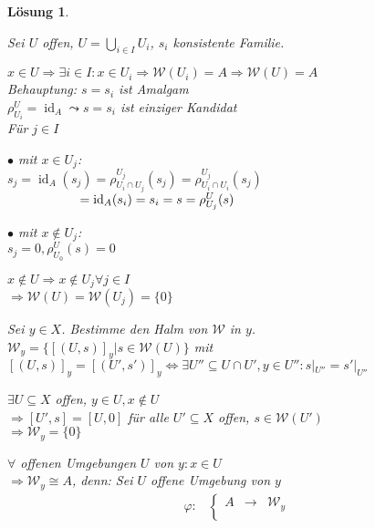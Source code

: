 \documentclass[a4paper, 12pt, numbers=noendperiod, chapterprefix=true]{scrbook}
\theoremstyle{break}
\newtheorem{Loes}{L\"osung}
\theoremstyle{nonumberbreak}
\theoremstyle{nonumberplain}
\DeclareMathOperator{\id}{id}
\newcommand{\calW}{\mathcal{W}}
\begin{document}
\begin{Loes}\begin{enumerate}[a)]
\item
  Sei $U$ offen, $U = \bigcup\limits_{i\in I} U_i$, $s_i$ konsistente Familie.
  \begin{description}[\setlabelstyle{\itshape}]
  \item[Fall 1:]
    $x \in U \Rightarrow \exists i \in I: x\in U_i \Rightarrow \calW(U_i) = A \Rightarrow  \calW(U) = A$\\
    \emph{Behauptung:} $s=s_i$ ist Amalgam\\
    $\rho_{U_i}^U= \id_A \leadsto s = s_i$ ist einziger Kandidat\\
    F\"ur $j\in I$\begin{description}
    \item{$\bullet$ mit $x\in U_j$:}\\
      $s_j = \id_A(s_j) = \rho_{U_i\cap U_j}^{U_j}(s_j) = \rho_{U_i\cap U_i}^{U_j}(s_j)$\\
      $\textcolor{white}{s_j = \id_A(s_j)}= \id_A(s_i) = s_i = s = \rho_{U_j}^U(s)$
    \item{$\bullet$ mit $x\notin U_j$:}\\
      $s_j = 0, \rho_{U_0}^U(s) = 0$
    \end{description}
  \item[Fall 2:]
    $x \notin U \Rightarrow x\notin U_j \forall j \in I$\\
    $\Rightarrow \calW(U) = \calW(U_j) = \{0\}$
  \end{description}
\item
  Sei $y \in X$. Bestimme den Halm von $\calW$ in $y$.\\
  $\calW_y = \{[(U,s)]_y \vert s\in \calW(U)\}$ mit $[(U,s)]_y = [(U',s')]_y \Leftrightarrow \exists U'' \subseteq U \cap U', y \in U'': s|_{U''} = s'|_{U''}$ \begin{description}[\setlabelstyle{\itshape}]
  \item[Fall 1:]$\exists U\subseteq X$ offen, $y\in U, x\notin U$\\
    $\Rightarrow [U',s] = [U,0]$ f\"ur alle $U'\subseteq X$ offen, $s\in \calW(U')$\\
    $\Rightarrow \calW_y = \{0\}$
  \item[Fall 2:] $\forall$ offenen Umgebungen $U$ von $y: x\in U$\\
    $\Rightarrow \calW_y \cong A$, \emph{denn:} Sei $U$ offene Umgebung von $y$
      \begin{equation*}\begin{split} \varphi:&\left\{\begin{array}{rcl} A &\to& \calW_y \\

\end{array}
\end{split}
\end{equation*}
\end{description}
\end{enumerate}
\end{Loes}
\end{document}
